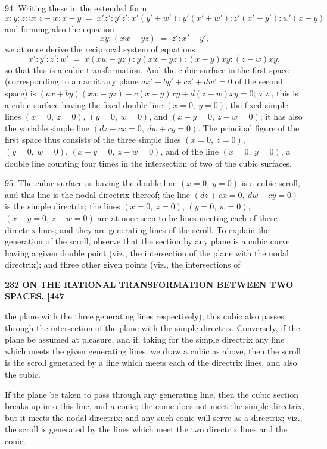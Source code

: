 \documentclass[11pt]{article}
\begin{document}
\medskip

94. Writing these in the extended form
\[ x:y:z:w:z-w:x-y \;=\; x'z' : y'z' : x'(y'+w') : y'(x'+w') : z'(x'-y') : w'(x-y) \]
and forming also the equation
\[ xy : (xw - yz) \;=\; z' : x' - y', \]
we at once derive the reciprocal system of equations
\[ x':y':z':w' \;=\; x(xw-yz) : y(xw-yz) : (x-y)xy : (z-w)xy, \]
so that this is a cubic transformation. And the cubic surface in the first space
(corresponding to an arbitrary plane $ax' + by' + cz' + dw' = 0$ of the second space) is
$(ax + by)(xw - yz) + c(x-y)xy + d(z-w)xy = 0$; viz., this is a cubic surface having
the fixed double line $(x=0,\ y=0)$, the fixed simple lines $(x=0,\ z=0)$, $(y=0,\ w=0)$,
and $(x-y=0,\ z-w=0)$; it has also the variable simple line $(dz + cx = 0,\ dw + cy = 0)$.
The principal figure of the first space thus consists of the three simple lines $(x=0,\ z=0)$,
$(y=0,\ w=0)$, $(x-y=0,\ z-w=0)$, and of the line $(x=0,\ y=0)$, a double line
counting four times in the intersection of two of the cubic surfaces.

\medskip

95. The cubic surface as having the double line $(x=0,\ y=0)$ is a cubic scroll,
and this line is the nodal directrix thereof; the line $(dz + cx = 0,\ dw + cy = 0)$ is the
simple directrix; the lines $(x=0,\ z=0)$, $(y=0,\ w=0)$, $(x-y=0,\ z-w=0)$ are at once
seen to be lines meeting each of these directrix lines; and they are generating lines
of the scroll. To explain the generation of the scroll, observe that the section by
any plane is a cubic curve having a given double point (viz., the intersection of the
plane with the nodal directrix); and three other given points (viz., the intersections of

\medskip
\noindent\textbf{232 \hfill ON THE RATIONAL TRANSFORMATION BETWEEN TWO SPACES. \hfill [447}

\medskip

the plane with the three generating lines respectively); this cubic also passes through
the intersection of the plane with the simple directrix. Conversely, if the plane be
assumed at pleasure, and if, taking for the simple directrix any line which meets the
given generating lines, we draw a cubic as above, then the scroll is the scroll
generated by a line which meets each of the directrix lines, and also the cubic.

If the plane be taken to pass through any generating line, then the cubic section
breaks up into this line, and a conic; the conic does not meet the simple directrix,
but it meets the nodal directrix; and any such conic will serve as a directrix; viz.,
the scroll is generated by the lines which meet the two directrix lines and the conic.
\end{document}
